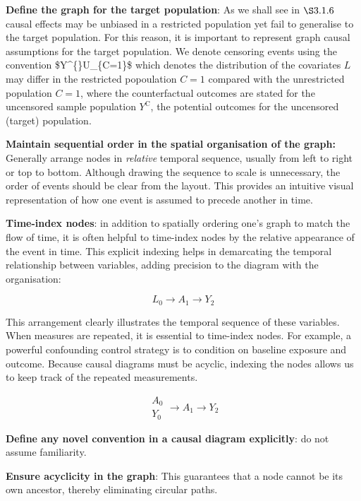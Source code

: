 \documentclass[
  singlecolumn]{article}
\begin{document}
\textbf{Define the graph for the target population}: As we shall see in
\(\S 3.1.6\) causal effects may be unbiased in a restricted population
yet fail to generalise to the target population. For this reason, it is
important to represent graph causal assumptions for the target
population. We denote censoring events using the convention
\$Y\^{}\{\}\leftarrowblue U\_\{C=1\}\rightarrowblue \$ which
denotes the distribution of the covariates \(L\) may differ in the
restricted popoulation \(C=1\) compared with the unrestricted population
\(C = 1\), where the counterfactual outcomes are stated for the
uncensored sample population \(Y^{\text{C}}\), the potential outcomes
for the uncensored (target) population.

\textbf{Maintain sequential order in the spatial organisation of the
graph:} Generally arrange nodes in \emph{relative} temporal sequence,
usually from left to right or top to bottom. Although drawing the
sequence to scale is unnecessary, the order of events should be clear
from the layout. This provides an intuitive visual representation of how
one event is assumed to precede another in time.

\textbf{Time-index nodes}: in addition to spatially ordering one's graph
to match the flow of time, it is often helpful to time-index nodes by
the relative appearance of the event in time. This explicit indexing
helps in demarcating the temporal relationship between variables, adding
precision to the diagram with the organisation:

\[\boxed{L_{0}} \to A_{1} \to Y_{2}\]

This arrangement clearly illustrates the temporal sequence of these
variables. When measures are repeated, it is essential to time-index
nodes. For example, a powerful confounding control strategy is to
condition on baseline exposure and outcome. Because causal diagrams must
be acyclic, indexing the nodes allows us to keep track of the repeated
measurements.

\[
\boxed{
\begin{aligned}
A_{0} \\
Y_{0}
\end{aligned}
}
\to A_{1} \to Y_{2}
\]

\textbf{Define any novel convention in a causal diagram explicitly}: do
not assume familiarity.

\textbf{Ensure acyclicity in the graph}: This guarantees that a node
cannot be its own ancestor, thereby eliminating circular paths.
\end{document}

